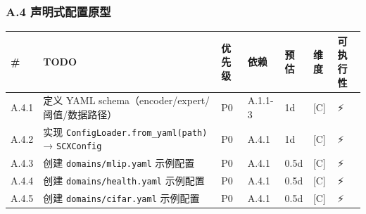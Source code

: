 \documentclass[
  12pt,
]{ctexart}
\begin{document}
\subsubsection{A.4
声明式配置原型}\label{a.4-ux58f0ux660eux5f0fux914dux7f6eux539fux578b}

\begin{longtable}[]{@{}
  >{\raggedright\arraybackslash}p{}
  >{\raggedright\arraybackslash}p{}
  >{\raggedright\arraybackslash}p{}
  >{\raggedright\arraybackslash}p{}
  >{\raggedright\arraybackslash}p{}
  >{\raggedright\arraybackslash}p{}
  >{\raggedright\arraybackslash}p{}@{}}
\toprule\noalign{}
\begin{minipage}[b]{\linewidth}\raggedright
\#
\end{minipage} & \begin{minipage}[b]{\linewidth}\raggedright
TODO
\end{minipage} & \begin{minipage}[b]{\linewidth}\raggedright
优先级
\end{minipage} & \begin{minipage}[b]{\linewidth}\raggedright
依赖
\end{minipage} & \begin{minipage}[b]{\linewidth}\raggedright
预估
\end{minipage} & \begin{minipage}[b]{\linewidth}\raggedright
维度
\end{minipage} & \begin{minipage}[b]{\linewidth}\raggedright
可执行性
\end{minipage} \\
\midrule\noalign{}
\endhead
\bottomrule\noalign{}
\endlastfoot
A.4.1 & 定义 YAML schema（encoder/expert/阈值/数据路径） & P0 & A.1.1-3
& 1d & {[}C{]} & ⚡ \\
A.4.2 & 实现 \texttt{ConfigLoader.from\_yaml(path)} → \texttt{SCXConfig}
& P0 & A.4.1 & 1d & {[}C{]} & ⚡ \\
A.4.3 & 创建 \texttt{domains/mlip.yaml} 示例配置 & P0 & A.4.1 & 0.5d &
{[}C{]} & ⚡ \\
A.4.4 & 创建 \texttt{domains/health.yaml} 示例配置 & P0 & A.4.1 & 0.5d &
{[}C{]} & ⚡ \\
A.4.5 & 创建 \texttt{domains/cifar.yaml} 示例配置 & P0 & A.4.1 & 0.5d &
{[}C{]} & ⚡ \\
\end{longtable}
\end{document}
